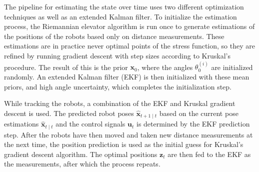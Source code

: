 The pipeline for estimating the state over time uses two different optimization techniques as well as an extended Kalman filter. To initialize the estimation process, the Riemannian elevator algorithm is run once to generate estimations of the positions of the robots based only on distance measurements. These estimations are in practice never optimal points of the stress function, so they are refined by running gradient descent with step sizes according to Kruskal's procedure. The result of this is the prior $\mathbf{x}_0$, where the angles $\theta_0^{(i)}$ are initialized randomly. An extended Kalman filter (EKF) is then initialized with these mean priors, and high angle uncertainty, which completes the initialization step. 

While tracking the robots, a combination of the EKF and Kruskal gradient descent is used. The predicted robot poses $\hat{\mathbf{x}}_{t+1 \mid t}$ based on the current pose estimations $\hat{\mathbf{x}}_{t \mid t}$ and the control signals $\mathbf{u}_t$ is determined by the EKF prediction step. After the robots have then moved and taken new distance measurements at the next time, the position prediction is used as the initial guess for Kruskal's gradient descent algorithm. The optimal positions $\mathbf{z}_t$ are then fed to the EKF as the measurements, after which the process repeats. 

